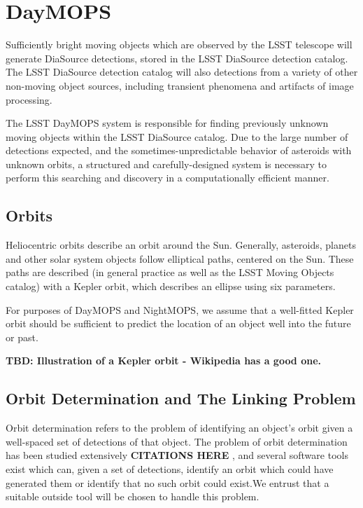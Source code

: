 \section{DayMOPS}
\label{linking}

Sufficiently bright moving objects which are observed by the LSST
telescope will generate DiaSource detections, stored in the LSST
DiaSource detection catalog.  The LSST DiaSource detection catalog
will also detections from a variety of other non-moving object
sources, including transient phenomena and artifacts of image
processing.

The LSST DayMOPS system is responsible for finding previously unknown
moving objects within the LSST DiaSource catalog.  Due to the large
number of detections expected, and the sometimes-unpredictable
behavior of asteroids with unknown orbits, a structured and
carefully-designed system is necessary to perform this searching and
discovery in a computationally efficient manner.






\subsection{Orbits}
Heliocentric orbits describe an orbit around the Sun.  Generally,
asteroids, planets and other solar system objects follow elliptical
paths, centered on the Sun.  These paths are described (in general
practice as well as the LSST Moving Objects catalog) with a Kepler
orbit, which describes an ellipse using six parameters. 

For purposes of DayMOPS and NightMOPS, we assume that a well-fitted
Kepler orbit should be sufficient to predict the location of an object
well into the future or past.  

\textbf{TBD: Illustration of a Kepler orbit - Wikipedia has a good one.}


\subsection{Orbit Determination and The Linking Problem}
Orbit determination refers to the problem of identifying an object's
orbit given a well-spaced set of detections of that object.  The
problem of orbit determination has been studied extensively \textbf{
  CITATIONS HERE }, and several software tools exist which can, given
a set of detections, identify an orbit which could have generated them
or identify that no such orbit could exist.We entrust that a suitable
outside tool will be chosen to handle this problem.

